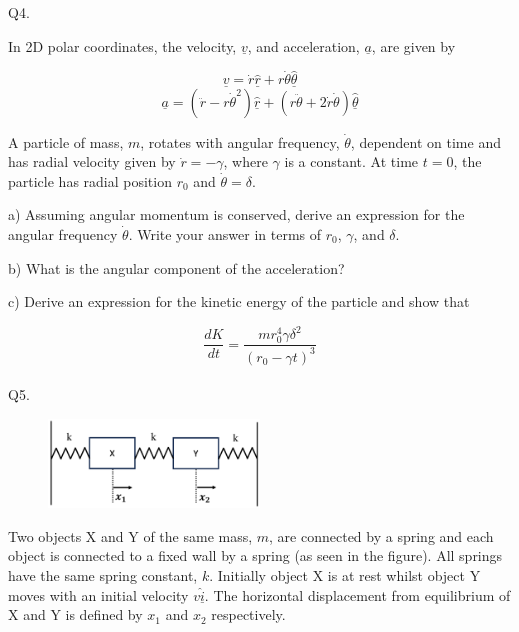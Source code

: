 \documentclass[a4paper,11pt]{article}
\begin{document}
Q4. 

In 2D polar coordinates, the velocity, \( \underline{v} \), and acceleration, \( \underline{a} \), are given by 

\[ 
\underline{v} = \dot{r} \underline{\hat{r}} + r \dot{\theta} \underline{\hat{\theta}} 
\]
\[ 
\underline{a} = (\ddot{r} - r \dot{\theta}^{2}) \underline{\hat{r}} + (r \ddot{\theta} + 2\dot{r}\dot{\theta} ) \underline{\hat{\theta}} 
\]

A particle of mass, \( m \), rotates with angular frequency, \( \dot{\theta} \), dependent on time and has radial velocity given by \( \dot{r} = - \gamma \), where \( \gamma \) is a constant. At time \( t = 0 \), the particle has radial position \( r_{0} \) and \( \dot{\theta} = \delta \). 

\medskip

a) Assuming angular momentum is conserved, derive an expression for the angular frequency \( \dot{\theta} \). Write your answer in terms of \( r_{0} \), \( \gamma \), and \( \delta \).

\medskip

b) What is the angular component of the acceleration?

\medskip

c) Derive an expression for the kinetic energy of the particle and show that 

\[
\frac{dK}{dt} = \frac{m r_{0}^{4} \gamma \delta^{2}}{(r_{0} - \gamma t)^{3}}
\] \\

Q5. 

\begin{figure}[h!]
    \centering
    \includegraphics[width=0.5\textwidth]{CMq5figure.PNG}
    \caption*{}
\end{figure}

Two objects X and Y of the same mass, \( m \), are connected by a spring and each object is connected to a fixed wall by a spring (as seen in the figure). All springs have the same spring constant, \( k \). Initially object X is at rest whilst object Y moves with an initial velocity \( v \hat{\underline{i}} \). The horizontal displacement from equilibrium of X and Y is defined by \( x_{1} \) and \( x_{2} \) respectively. 
\end{document}
